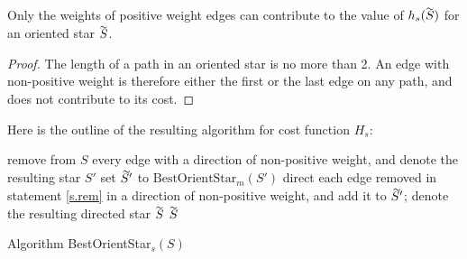   \begin{lemma}
  	Only the weights of positive weight edges can contribute to the value of $h_s(\tildeb{S})$ for an oriented star $\tildeb{S}$.
  \end{lemma} 
\begin{proof}
	The length of a path in an oriented star is no more than 2. 
	An edge with non-positive weight is therefore either the first or 
	the last edge on any path, and does not contribute to its cost. 
\end{proof}

Here is the outline of the resulting algorithm for cost function $H_s$:
 \begin{algorithm}\label{a.stars}
	remove from $S$ every edge with a direction of non-positive weight, and denote the resulting star $S'$
	\label{s.rem} \;
	set $\tildeb{S'}$ to $\mbox{BestOrientStar}_m (S')$\;
	direct each edge removed in statement \ref{s.rem} in a direction of non-positive weight,
	and add it to $\tildeb{S'}$;
	denote the resulting directed star $\tildeb{S}$\;
	\Return $\tildeb{S}$\;
	\caption{Algorithm BestOrientStar$_s (S)$}
	\label{algo:oc-s}
\end{algorithm}
